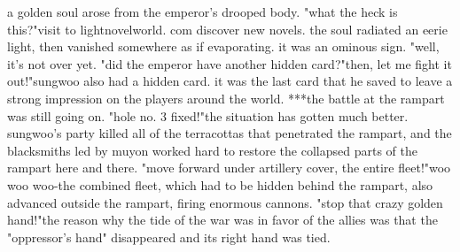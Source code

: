 a golden soul arose from the emperor's drooped body.
"what the heck is this?"visit to lightnov‌elworld.
c­om discover new novels.
the soul radiated an eerie light, then vanished somewhere as if evaporating.
it was an ominous sign.
"well, it's not over yet.
"did the emperor have another hidden card?"then, let me fight it out!"sungwoo also had a hidden card.
it was the last card that he saved to leave a strong impression on the players around the world.
***the battle at the rampart was still going on.
"hole no.
 3 fixed!"the situation has gotten much better.
 sungwoo's party killed all of the terracottas that penetrated the rampart, and the blacksmiths led by muyon worked hard to restore the collapsed parts of the rampart here and there.
 "move forward under artillery cover, the entire fleet!"woo woo woo-the combined fleet, which had to be hidden behind the rampart, also advanced outside the rampart, firing enormous cannons.
 "stop that crazy golden hand!"the reason why the tide of the war was in favor of the allies was that the "oppressor's hand" disappeared and its right hand was tied.
 
